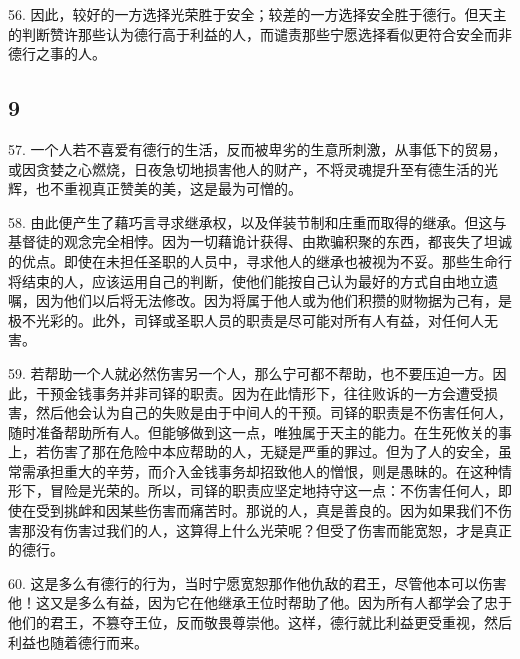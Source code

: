 56. 因此，较好的一方选择光荣胜于安全；较差的一方选择安全胜于德行。但天主的判断赞许那些认为德行高于利益的人，而谴责那些宁愿选择看似更符合安全而非德行之事的人。\par


\subsection{9}

\par

57. 一个人若不喜爱有德行的生活，反而被卑劣的生意所刺激，从事低下的贸易，或因贪婪之心燃烧，日夜急切地损害他人的财产，不将灵魂提升至有德生活的光辉，也不重视真正赞美的美，这是最为可憎的。\par

58. 由此便产生了藉巧言寻求继承权，以及佯装节制和庄重而取得的继承。但这与基督徒的观念完全相悖。因为一切藉诡计获得、由欺骗积聚的东西，都丧失了坦诚的优点。即使在未担任圣职的人员中，寻求他人的继承也被视为不妥。那些生命行将结束的人，应该运用自己的判断，使他们能按自己认为最好的方式自由地立遗嘱，因为他们以后将无法修改。因为将属于他人或为他们积攒的财物据为己有，是极不光彩的。此外，司铎或圣职人员的职责是尽可能对所有人有益，对任何人无害。\par

59. 若帮助一个人就必然伤害另一个人，那么宁可都不帮助，也不要压迫一方。因此，干预金钱事务并非司铎的职责。因为在此情形下，往往败诉的一方会遭受损害，然后他会认为自己的失败是由于中间人的干预。司铎的职责是不伤害任何人，随时准备帮助所有人。但能够做到这一点，唯独属于天主的能力。在生死攸关的事上，若伤害了那在危险中本应帮助的人，无疑是严重的罪过。但为了人的安全，虽常需承担重大的辛劳，而介入金钱事务却招致他人的憎恨，则是愚昧的。在这种情形下，冒险是光荣的。所以，司铎的职责应坚定地持守这一点：不伤害任何人，即使在受到挑衅和因某些伤害而痛苦时。那说的人，真是善良的。因为如果我们不伤害那没有伤害过我们的人，这算得上什么光荣呢？但受了伤害而能宽恕，才是真正的德行。\par

60. 这是多么有德行的行为，当时宁愿宽恕那作他仇敌的君王，尽管他本可以伤害他！这又是多么有益，因为它在他继承王位时帮助了他。因为所有人都学会了忠于他们的君王，不篡夺王位，反而敬畏尊崇他。这样，德行就比利益更受重视，然后利益也随着德行而来。\par

